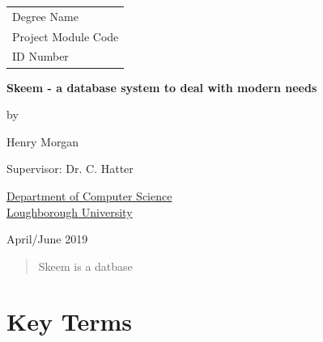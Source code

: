\documentclass[
  12pt,
]{article}
\date{}
\begin{document}

\thispagestyle{empty}


\begin{center}

\Large{
\hfill \begin{tabular}{l}
Degree Name \\
Project Module Code \\
ID Number
\end{tabular}
}


\vspace*{\fill}

\Large{\textbf{Skeem - a database system to deal with modern needs}}

\vspace*{\fill}

by

\vspace*{\fill}


Henry Morgan


\vspace*{\fill}

Supervisor: Dr. C. Hatter
\vspace*{\fill}

\underline{Department of Computer Science} \\
\underline{Loughborough University}

\vspace*{\fill}
April/June 2019

\end{center}
\newpage




\begin{abstract}
  Skeem is a datbase
\end{abstract}

\newpage













{
\setcounter{tocdepth}{3}
\tableofcontents
}
\newpage
\hypertarget{key-terms}{%
\section{Key Terms}\label{key-terms}}
\end{document}
